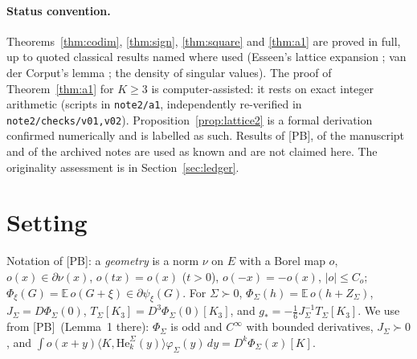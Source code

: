 \documentclass[10pt]{article}
\theoremstyle{definition}
\theoremstyle{remark}
\newcommand{\E}{\mathbb{E}}
\newcommand{\inner}[2]{\langle #1, #2\rangle}
\newcommand{\He}{\mathrm{He}}
\newcommand{\PB}{\textup{[PB]}}
\begin{document}
\paragraph{Status convention.} Theorems~\ref{thm:codim}, \ref{thm:sign}, \ref{thm:square} and \ref{thm:a1} are proved in
full, up to quoted classical results named where used (Esseen's lattice expansion \cite{esseen,gk}; van der Corput's
lemma \cite{stein}; the density of singular values). The proof of Theorem~\ref{thm:a1} for $K\ge3$ is
computer-assisted: it rests on exact integer arithmetic (scripts in \texttt{note2/a1}, independently re-verified in
\texttt{note2/checks/v01,v02}). Proposition~\ref{prop:lattice2} is a formal derivation confirmed numerically and is
labelled as such. Results of \PB, of the manuscript \cite{manuscript} and of the archived notes are used as known and
are not claimed here. The originality assessment is in Section~\ref{sec:ledger}.

\section{Setting}\label{sec:setting}

Notation of \PB: a \emph{geometry} is a norm $\nu$ on $E$ with a Borel map $o$, $o(x)\in\partial\nu(x)$,
$o(tx)=o(x)$ ($t>0$), $o(-x)=-o(x)$, $|o|\le C_o$; $\Phi_\xi(G)=\E\,o(G+\xi)\in\partial\psi_\xi(G)$. For $\Sigma\succ0$,
$\Phi_\Sigma(h)=\E\,o(h+Z_\Sigma)$, $J_\Sigma=D\Phi_\Sigma(0)$, $T_\Sigma[K_3]=D^3\Phi_\Sigma(0)[K_3]$, and
$g_\ast=-\frac16J_\Sigma^{-1}T_\Sigma[K_3]$. We use from \PB\ (Lemma~1 there): $\Phi_\Sigma$ is odd and $C^\infty$ with
bounded derivatives, $J_\Sigma\succ0$, and $\int o(x+y)\inner{K}{\He^\Sigma_k(y)}\varphi_\Sigma(y)\,dy=D^k\Phi_\Sigma(x)[K]$.
\end{document}
